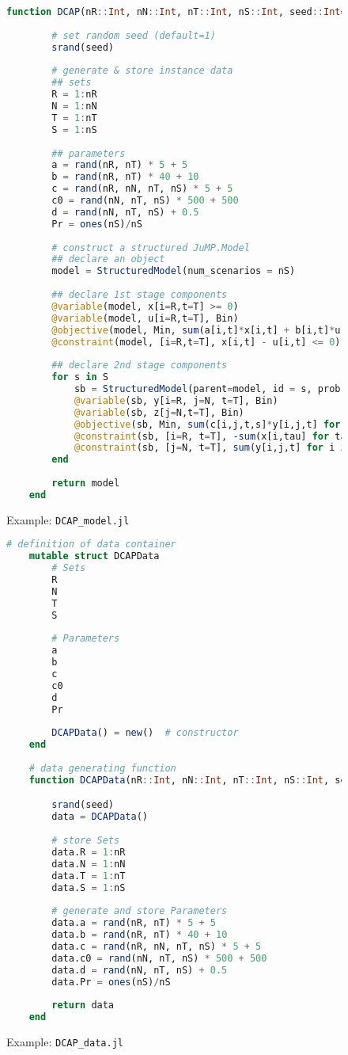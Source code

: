 \begin{figure}[]
	\centering
	\begin{lstlisting}[frame=single,language=julia]
	function DCAP(nR::Int, nN::Int, nT::Int, nS::Int, seed::Int=1)::JuMP.Model
		
		# set random seed (default=1)
		srand(seed)
		
		# generate & store instance data
		## sets
		R = 1:nR
		N = 1:nN
		T = 1:nT
		S = 1:nS
		
		## parameters
		a = rand(nR, nT) * 5 + 5
		b = rand(nR, nT) * 40 + 10
		c = rand(nR, nN, nT, nS) * 5 + 5
		c0 = rand(nN, nT, nS) * 500 + 500
		d = rand(nN, nT, nS) + 0.5
		Pr = ones(nS)/nS
		
		# construct a structured JuMP.Model
		## declare an object
		model = StructuredModel(num_scenarios = nS)
		
		## declare 1st stage components
		@variable(model, x[i=R,t=T] >= 0)
		@variable(model, u[i=R,t=T], Bin)
		@objective(model, Min, sum(a[i,t]*x[i,t] + b[i,t]*u[i,t] for i in R for t in T))
		@constraint(model, [i=R,t=T], x[i,t] - u[i,t] <= 0)
		
		## declare 2nd stage components
		for s in S
			sb = StructuredModel(parent=model, id = s, prob = Pr[s])
			@variable(sb, y[i=R, j=N, t=T], Bin)
        	@variable(sb, z[j=N,t=T], Bin)
			@objective(sb, Min, sum(c[i,j,t,s]*y[i,j,t] for i in R for j in N for t in T) + sum(c0[j,t,s]*z[j,t] for j in N for t in T))
			@constraint(sb, [i=R, t=T], -sum(x[i,tau] for tau in 1:t) + sum(d[j,t,s]*y[i,j,t] for j in N) <= 0)
			@constraint(sb, [j=N, t=T], sum(y[i,j,t] for i in R) + z[j,t] == 1)
		end
		
		return model
	end

	\end{lstlisting}
	\caption{Example: \texttt{DCAP\_model.jl}}\label{fig:DCAP_model.jl}
\end{figure}

\begin{figure}[]
	\centering
	\begin{lstlisting}[frame=single,language=julia]
	# definition of data container
	mutable struct DCAPData	
		# Sets
		R   
		N  
		T   
		S  
		
		# Parameters
		a   
		b   
		c  
		c0  
		d   
		Pr  
		
		DCAPData() = new()	# constructor
	end
	
	# data generating function
	function DCAPData(nR::Int, nN::Int, nT::Int, nS::Int, seed::Int)::DCAPData

		srand(seed)
		data = DCAPData()
		
		# store Sets
		data.R = 1:nR	
		data.N = 1:nN	
		data.T = 1:nT	
		data.S = 1:nS	
		
		# generate and store Parameters
		data.a = rand(nR, nT) * 5 + 5
		data.b = rand(nR, nT) * 40 + 10	
		data.c = rand(nR, nN, nT, nS) * 5 + 5	
		data.c0 = rand(nN, nT, nS) * 500 + 500	
		data.d = rand(nN, nT, nS) + 0.5	
		data.Pr = ones(nS)/nS
		
		return data
	end
	\end{lstlisting}
	\caption{Example: \texttt{DCAP\_data.jl}}
	\label{fig:DCAP_data.jl}
\end{figure}

